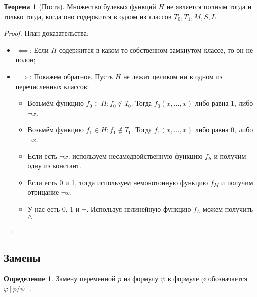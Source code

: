 \documentclass[12pt]{article}
\let\la\land
\let\n\neg
\let\nin\notin
\theoremstyle{definition}
\newtheorem{definition}{Определение}[section]
\newtheorem{theorem}{Теорема}[section]
\theoremstyle{statement}
\theoremstyle{theorem}
\begin{document}
\begin{theorem}[Поста]
  Множество булевых функций $H$ не является полным тогда и только
  тогда, когда оно содержится в одном из классов $T_0, T_1, M, S, L$.
  \begin{proof}
    План доказательства:
    \begin{itemize}
      \item $\impliedby$: Если $H$ содержится в каком-то собственном
        замкнутом классе, то он не полон;

      \item $\implies$: Покажем обратное. Пусть $H$ не лежит целиком
        ни в одном из перечисленных классов:
        \begin{itemize}
          \item Возьмём функцию $f_0 \in H \colon f_0 \nin T_0$.
            Тогда $f_0(x, \dots, x)$ либо равна 1, либо $\n x$.

          \item Возьмём функцию $f_1 \in H \colon f_1 \nin T_1$.
            Тогда $f_1(x, \dots, x)$ либо равна 0, либо $\n x$.

          \item Если есть $\n x$: используем несамодвойственную
            функцию $f_S$ и получим одну из констант.

          \item Если есть 0 и 1, тогда используем немонотонную
            функцию $f_M$ и получим отрицание $\n x$.

          \item У нас есть 0, 1 и $\n$. Используя нелинейную функцию
            $f_L$ можем получить $\la$
        \end{itemize}
    \end{itemize}
  \end{proof}
\end{theorem}

\subsection{Замены}

\begin{definition}
  Замену переменной $p$ на формулу $\psi$ в формуле $\varphi$
  обозначается $\varphi[p/\psi]$.
\end{definition}
\end{document}
